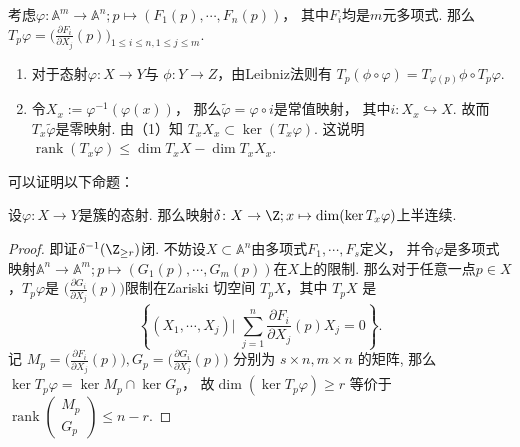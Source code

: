     \begin{example}
        考虑$\varphi\colon\mathbb{A}^{m} \rightarrow \mathbb{A}^{n};
        p \mapsto (F_{1}(p),\cdots,F_{n}(p))$，
        其中$F_{i}$均是$m$元多项式.
        那么$T_{p}\varphi=\big(\frac{\partial F_{i}}{\partial{X_{j}}}(p)\big)
        _{1 \leq i \leq n,1 \leq j \leq m}$.
    \end{example}

    \begin{remark}
        \begin{enumerate}
            \item[(1)] 对于态射$\varphi\colon X \rightarrow Y$与
            $\phi\colon Y \rightarrow Z$，由Leibniz法则有
            $T_{p}(\phi\circ\varphi)=T_{\varphi(p)}\phi \circ 
            T_{p}\varphi$.
            \item[(2)] 令$X_{x}:=\varphi^{-1}(\varphi(x))$，
            那么$\widetilde{\varphi}=\varphi \circ i$是常值映射，
            其中$i\colon X_{x} \hookrightarrow X$. 
            故而$T_{x}\widetilde{\varphi}$是零映射. 由（1）知
            $T_{x}X_{x} \subset \ker(T_{x}\varphi)$. 这说明
            $\operatorname{rank}(T_{x}\varphi) \leq \dim T_{x}X-\dim T_{x}X_{x}$.
        \end{enumerate}
    \end{remark}
    
    可以证明以下命题：

    \begin{lemma}
      设$\varphi\colon X \rightarrow Y$是簇的态射. 
      那么映射$\delta\colon X \rightarrow \Z;
      x \mapsto \dim(\ker T_{x}\varphi)$上半连续.
    \end{lemma}
    \begin{proof}
      即证$\delta^{-1}(\Z_{\geq r})$闭.
      不妨设$X \subset \mathbb{A}^{n}$由多项式$F_{1},\cdots,F_{s}$定义，
      并令$\varphi$是多项式映射$\mathbb{A}^{n} \rightarrow \mathbb{A}^{m};
      p \mapsto (G_{1}(p),\cdots,G_{m}(p))$在$X$上的限制. 
      那么对于任意一点$p \in X$，$T_{p}\varphi$是
      $\big(\frac{\partial G_{i}}{\partial{X_{j}}}(p)\big)$限制在Zariski 切空间
      $T_{p}X$，其中 $T_{p}X$ 是
      $$
        \left\{(X_1,\cdots,X_{j})|\;\sum_{j=1}^{n}\frac{\partial F_{i}}{\partial X_{j}}(p)X_{j}=0\right\}.
      $$
      记 $M_{p}=\big(\frac{\partial F_{i}}{\partial X_{j}}(p)\big), 
      G_{p}=\big(\frac{\partial G_{i}}{\partial{X_{j}}}(p)\big)$ 
      分别为 $s\times n,m\times n$ 的矩阵,
      那么$\ker T_{p}\varphi = \ker M_{p}\cap \ker G_{p}$，
      故$\dim(\ker T_{p}\varphi) \geq r$ 等价于 
      $\operatorname{rank}\left(\begin{matrix}M_{p}\\G_{p}\end{matrix}\right)\leq n-r$.
    \end{proof}

